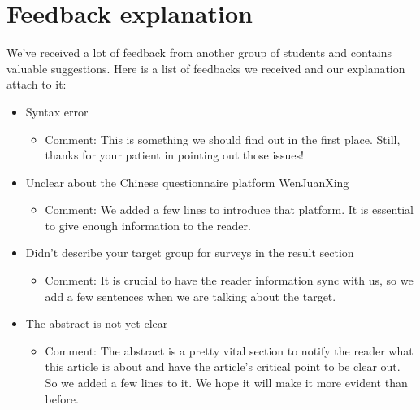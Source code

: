 \newpage
\section{Feedback explanation}
We've received a lot of feedback from another group of students and contains valuable suggestions. Here is a list of feedbacks we received and our explanation attach to it:
\begin{itemize}
    \item Syntax error
    \begin{itemize}
        \item Comment: This is something we should find out in the first place. Still, thanks for your patient in pointing out those issues!
    \end{itemize}
    \item Unclear about the Chinese questionnaire platform WenJuanXing
    \begin{itemize}
        \item Comment: We added a few lines to introduce that platform. It is essential to give enough information to the reader.
    \end{itemize}
    \item Didn’t describe your target group for surveys in the result section
    \begin{itemize}
        \item Comment: It is crucial to have the reader information sync with us, so we add a few sentences when we are talking about the target.
    \end{itemize}
    \item The abstract is not yet clear
    \begin{itemize}
        \item Comment: The abstract is a pretty vital section to notify the reader what this article is about and have the article's critical point to be clear out. So we added a few lines to it. We hope it will make it more evident than before.
    \end{itemize}

\end{itemize}
    
